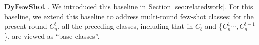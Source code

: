 \documentclass[11pt]{article}
\begin{document}


    
\textbullet\enspace \textbf{DyFewShot} \cite{DBLPGidarisK18}. 
We introduced this baseline in Section \ref{sec:relatedwork}. 
For this baseline, we extend this baseline to address multi-round few-shot classes: for the present round $C_n^t$, all the preceding classes, including that in $C_b$ and \{$C_n^1\cdots, C_n^{t-1}$\}, are viewed as ``base classes''.
\end{document}
